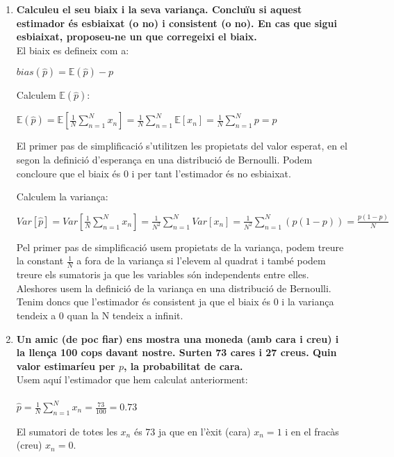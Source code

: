 \documentclass[a4paper]{article}
\begin{document}
\begin{enumerate}
		
	
	\item\textbf{ Calculeu el seu biaix i la seva variança. Concluïu si aquest estimador és esbiaixat (o no) i consistent (o no). En cas que sigui esbiaixat, proposeu-ne un que corregeixi el biaix.}\\
	
	El biaix es defineix com a:
	
	$bias(\hat{p}) = \mathbb{E}(\hat{p}) - p$
	
	Calculem $\mathbb{E}(\hat{p})$:
	
	$\mathbb{E}(\hat{p}) = \mathbb{E}\left[\frac{1}{N}\sum_{n=1}^{N}x_n\right] = \frac{1}{N}\sum_{n=1}^{N}\mathbb{E}\left[x_n\right] = \frac{1}{N}\sum_{n=1}^{N} p = p $
	
	El primer pas de simplificació s'utilitzen les propietats del valor esperat, en el segon la definició d'esperança en una distribució de Bernoulli. Podem concloure que el biaix és $0$ i per tant l'estimador és no esbiaixat.
	
	Calculem la variança:
	
	$Var[\hat{p}] = Var\left[\frac{1}{N}\sum_{n=1}^{N}x_n\right] = \frac{1}{N^2}\sum_{n=1}^{N} Var\left[x_n\right] = \frac{1}{N^2}\sum_{n=1}^{N} (p (1-p)) = \boxed{\frac{p(1-p)}{N}}$
	
	Pel primer pas de simplificació usem propietats de la variança, podem treure la constant $\frac{1}{N}$ a fora de la variança si l'elevem al quadrat i també podem treure els sumatoris ja que les variables són independents entre elles. Aleshores usem la definició de la variança en una distribució de Bernoulli. Tenim doncs que l'estimador és consistent ja que el biaix és $0$ i la variança tendeix a $0$ quan la N tendeix a infinit.
	
	
	\item\textbf{ Un amic (de poc fiar) ens mostra una moneda (amb cara i creu) i la llença 100 cops davant nostre. Surten 73 cares i 27 creus. Quin valor estimaríeu per $p$, la probabilitat de cara.}\\
	
	Usem aquí l'estimador que hem calculat anteriorment:\\\\
	$\hat{p} = \frac{1}{N}\sum_{n=1}^{N}x_n = \frac{73}{100} = \boxed{0.73}$
	
	El sumatori de totes les $x_n$ és 73 ja que en l'èxit (cara) $x_n = 1$ i en el fracàs (creu) $x_n = 0$.
\end{enumerate}
\end{document}
